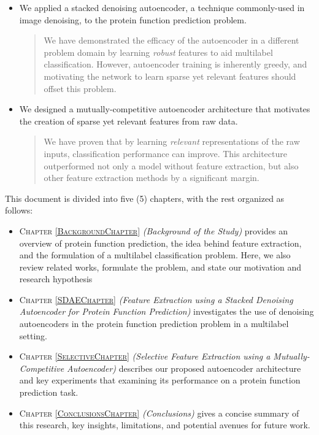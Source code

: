 \begin{itemize}
    \item We applied a stacked denoising autoencoder, a technique
    commonly-used in image denoising, to the protein function prediction problem.
    \begin{quote}
    \par We have demonstrated the efficacy of the autoencoder in a different
    problem domain by learning \textit{robust} features to aid multilabel
    classification. However, autoencoder training is inherently greedy, and
    motivating the network to learn sparse yet relevant features should
    offset this problem.
    \end{quote}
    \item We designed a mutually-competitive autoencoder architecture that
    motivates the creation of sparse yet relevant features from raw data.
    \begin{quote}
    \par We have proven that by learning \textit{relevant} representations
    of the raw inputs, classification performance can improve. This architecture
    outperformed not only a model without feature extraction, but also other
    feature extraction methods by a significant margin. 
    \end{quote}
\end{itemize}



\par \noindent This document is divided into five (5) chapters, with the rest
organized as follows:

\begin{itemize}
    \item \textsc{Chapter \ref{BackgroundChapter}} \textit{(Background of the
        Study)} provides an overview of protein function prediction, the idea
        behind feature extraction, and the formulation of a multilabel
        classification problem. Here, we also review related works, formulate
        the problem, and state our motivation and research hypothesis
    \item \textsc{Chapter \ref{SDAEChapter}} \textit{(Feature Extraction using
        a Stacked Denoising Autoencoder for Protein Function Prediction)}
        investigates the use of denoising autoencoders in the protein function
        prediction problem in a multilabel setting.
    \item \textsc{Chapter \ref{SelectiveChapter}} \textit{(Selective Feature
        Extraction using a Mutually-Competitive Autoencoder)} describes our
        proposed autoencoder architecture and key experiments that examining
        its performance on a protein function prediction task.
    \item \textsc{Chapter \ref{ConclusionsChapter}} \textit{(Conclusions)}
        gives a concise summary of this research, key insights, limitations,
        and potential avenues for future work.
\end{itemize}
